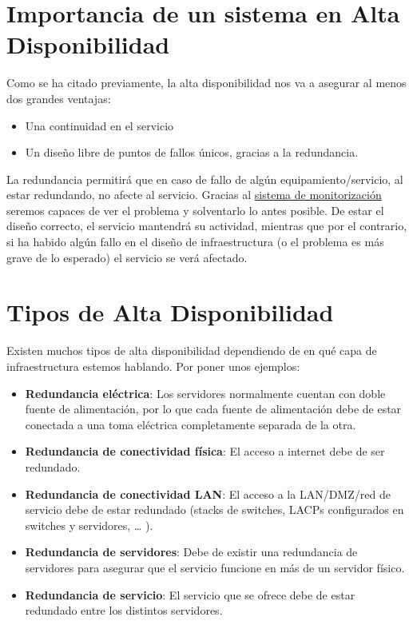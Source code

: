 \section{Importancia de un sistema en Alta Disponibilidad}

Como se ha citado previamente, la alta disponibilidad nos va a asegurar al menos dos grandes ventajas:

\begin{itemize}
    \item Una continuidad en el servicio
    \item Un diseño libre de puntos de fallos únicos, gracias a la redundancia.
\end{itemize}

La redundancia permitirá que en caso de fallo de algún equipamiento/servicio, al estar redundando, no afecte al servicio. Gracias al \hyperlink{monitorizacion_de_sgbds}{sistema de monitorización} seremos capaces de ver el problema y solventarlo lo antes posible. De estar el diseño correcto, el servicio mantendrá su actividad, mientras que por el contrario, si ha habido algún fallo en el diseño de infraestructura (o el problema es más grave de lo esperado) el servicio se verá afectado.


\section{Tipos de Alta Disponibilidad}
Existen muchos tipos de alta disponibilidad dependiendo de en qué capa de infraestructura estemos hablando. Por poner unos ejemplos:

\begin{itemize}
    \item \textbf{Redundancia eléctrica}: Los servidores normalmente cuentan con doble fuente de alimentación, por lo que cada fuente de alimentación debe de estar conectada a una toma eléctrica completamente separada de la otra.
    \item \textbf{Redundancia de conectividad física}: El acceso a internet debe de ser redundado.
    \item \textbf{Redundancia de conectividad LAN}: El acceso a la LAN/DMZ/red de servicio debe de estar redundado (stacks de switches, LACPs configurados en switches y servidores, … ).
    \item \textbf{Redundancia de servidores}: Debe de existir una redundancia de servidores para asegurar que el servicio funcione en más de un servidor físico.
    \item \textbf{Redundancia de servicio}: El servicio que se ofrece debe de estar redundado entre los distintos servidores.
\end{itemize}


